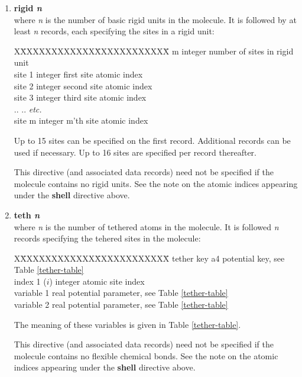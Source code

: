 \begin{enumerate}
{\bf Note} that in \D PMF constraints are handeled in every available
ensemble.

\item{\bf rigid {\em n}}\\
where {\em n} is the number of basic rigid units in the molecule.  It is
followed by at least {\em n} records, each specifying the sites in a rigid
unit:
\begin{tabbing}
X\=XXXXXXXXXXXX\=XXXXXXXXXXXX\=\kill
\> m      \> integer \> number of sites in rigid unit \\
\> site 1 \> integer \> first site atomic index \\
\> site 2 \> integer \> second site atomic index \\
\> site 3 \> integer \> third site atomic index \\
\> .. \> .. \> {\em etc.} \\
\> site m \> integer \> m'th site atomic index
\end{tabbing}
Up to 15 sites can be specified on the first record.  Additional records
can be used if necessary.  Up to 16 sites are specified per record thereafter.

This directive (and associated data records) need not be specified if the
molecule contains no rigid units.  See the note on the atomic indices
appearing under the {\bf shell} directive above.

\item{\bf teth {\em n}} \\
where {\em n} is the number of tethered atoms in the molecule.  It
is followed {\em n} records specifying the tehered sites in the
molecule:
\begin{tabbing}
X\=XXXXXXXXXXXX\=XXXXXXXXXXXX\=\kill
\> tether key    \> a4      \> potential key, see Table \ref{tether-table} \\
\> index 1 ($i$) \> integer \> atomic site index \\
\> variable 1    \> real    \> potential parameter, see Table \ref{tether-table} \\
\> variable 2    \> real    \> potential parameter, see Table \ref{tether-table}
\end{tabbing}
The meaning of these variables is given in Table
\ref{tether-table}.

This directive (and associated data records) need not be specified
if the molecule contains no flexible chemical bonds.  See the note
on the atomic indices appearing under the {\bf shell} directive
above.


\end{enumerate}
